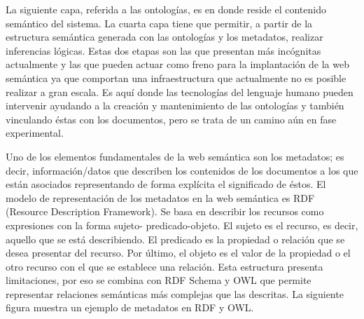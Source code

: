 La siguiente capa, referida a las ontologías, es en donde reside el contenido semántico del sistema. La cuarta capa tiene que permitir, a partir de la estructura semántica generada con las ontologías y los metadatos, realizar inferencias lógicas. Estas dos etapas son las que presentan más incógnitas actualmente y las que pueden actuar como freno para la implantación de la web semántica ya que comportan una infraestructura que actualmente no es posible realizar a gran escala. Es aquí donde las tecnologías del lenguaje humano pueden intervenir ayudando a la creación y mantenimiento de las ontologías y también vinculando éstas con los documentos, pero se trata de un camino aún en fase experimental.











Uno de los elementos fundamentales de la web semántica son los metadatos; es decir, información/datos que describen los contenidos de los documentos a los que están asociados representando de forma explícita el significado de éstos. El modelo de representación de los metadatos en la web semántica es RDF (Resource Description Framework). Se basa en describir los recursos como expresiones con la forma sujeto- predicado-objeto. El sujeto es el recurso, es decir, aquello que se está describiendo. El predicado es la propiedad o relación que se desea presentar del recurso. Por último, el objeto es el valor de la propiedad o el otro recurso con el que se establece una relación. Esta estructura presenta limitaciones, por eso se combina con RDF Schema y OWL que permite representar relaciones semánticas más complejas que las descritas. La siguiente figura muestra un ejemplo de metadatos en RDF y OWL.

